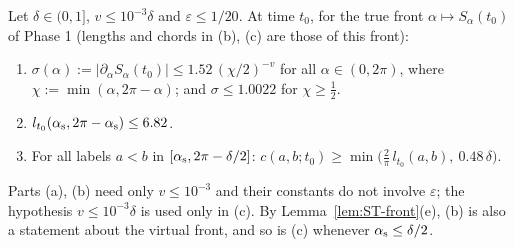 \begin{lemma}\label{lem:ST-D2}
Let $\delta\in(0,1]$, $v\le10^{-3}\delta$ and $\varepsilon\le1/20$. At time $t_0$, for the true front $\alpha\mapsto S_\alpha(t_0)$ of
Phase 1 (lengths and chords in (b), (c) are those of this front):
\begin{enumerate}
\item[(a)] $\sigma(\alpha):=|\partial_\alpha S_\alpha(t_0)|\le1.52\,(\chi/2)^{-v}$ for all $\alpha\in(0,2\pi)$, where
$\chi:=\min(\alpha,2\pi-\alpha)$; and $\sigma\le1.0022$ for $\chi\ge\frac12$.
\item[(b)] $l_{t_0}(\alpha_{\mathrm s},2\pi-\alpha_{\mathrm s})\le6.82$.
\item[(c)] For all labels $a<b$ in $[\alpha_{\mathrm s},2\pi-\delta/2]$: $c(a,b;t_0)\ge\min\bigl(\tfrac2\pi\,l_{t_0}(a,b),\ 0.48\,\delta\bigr)$.
\end{enumerate}
Parts (a), (b) need only $v\le10^{-3}$ and their constants do not involve $\varepsilon$; the hypothesis $v\le10^{-3}\delta$ is used
only in (c). By Lemma~\ref{lem:ST-front}(e), (b) is also a statement about the virtual front, and so is (c) whenever
$\alpha_{\mathrm s}\le\delta/2$.
\end{lemma}
